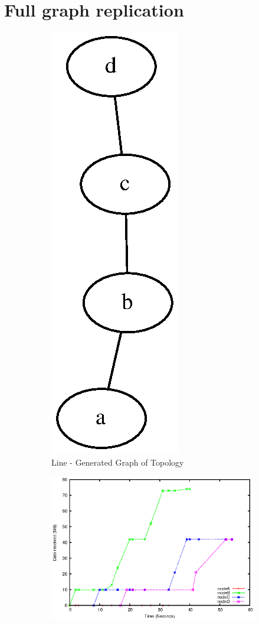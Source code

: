 \documentclass[12pt]{article}
\begin{document}
\section{Full graph replication}
\begin{figure}[htp]
    \begin{subfigure}[b]{0.5\linewidth}
        \centering
        \includegraphics[scale=0.5]{images/line-graph.eps}
        \caption{Line - Generated Graph of Topology}
        \label{fig:line_graph}
    \end{subfigure}
    \begin{subfigure}[b]{0.5\linewidth}
        \centering
        \includegraphics[scale=0.5]{images/line-scp-10-fixes.eps}

\end{subfigure}
\end{figure}
\end{document}
